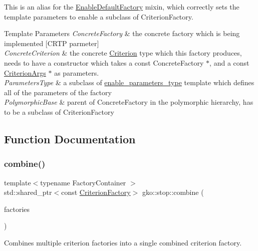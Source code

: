 This is an alias for the \hyperlink{classgko_1_1EnableDefaultFactory}{Enable\+Default\+Factory} mixin, which correctly sets the template parameters to enable a subclass of Criterion\+Factory. 


\begin{DoxyTemplParams}{Template Parameters}
{\em Concrete\+Factory} & the concrete factory which is being implemented \mbox{[}C\+R\+TP parmeter\mbox{]} \\
\hline
{\em Concrete\+Criterion} & the concrete \hyperlink{classgko_1_1stop_1_1Criterion}{Criterion} type which this factory produces, needs to have a constructor which takes a const Concrete\+Factory $\ast$, and a const \hyperlink{structgko_1_1stop_1_1CriterionArgs}{Criterion\+Args} $\ast$ as parameters. \\
\hline
{\em Parameters\+Type} & a subclass of \hyperlink{structgko_1_1enable__parameters__type}{enable\+\_\+parameters\+\_\+type} template which defines all of the parameters of the factory \\
\hline
{\em Polymorphic\+Base} & parent of Concrete\+Factory in the polymorphic hierarchy, has to be a subclass of Criterion\+Factory \\
\hline
\end{DoxyTemplParams}


\subsection{Function Documentation}
\mbox{\label{group__stop_ga3a3325b3a7660501f3bb72d08b09f2d2}} 
\subsubsection{\texorpdfstring{combine()}{combine()}}
{\footnotesize\ttfamily template$<$typename Factory\+Container $>$ \\
std\+::shared\+\_\+ptr$<$const \hyperlink{group__stop_gab12a51109c50b35ec36dc5a393d6a9a0}{Criterion\+Factory}$>$ gko\+::stop\+::combine (\begin{DoxyParamCaption}\item[{Factory\+Container \&\&}]{factories }\end{DoxyParamCaption})}



Combines multiple criterion factories into a single combined criterion factory. 

